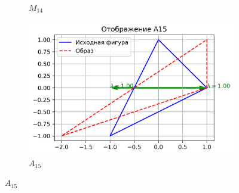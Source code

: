 \begin{figure}[H]
\begin{subfigure}[b]{0.3\textwidth}
    \caption{$M_{14}$}
  \end{subfigure}\hfill
  \begin{subfigure}[b]{0.3\textwidth}
    \includegraphics[width=\linewidth]{plots/A15.png}
    \caption{$A_{15}$}
  \end{subfigure}

  \vspace{0.5cm}


\end{figure}
